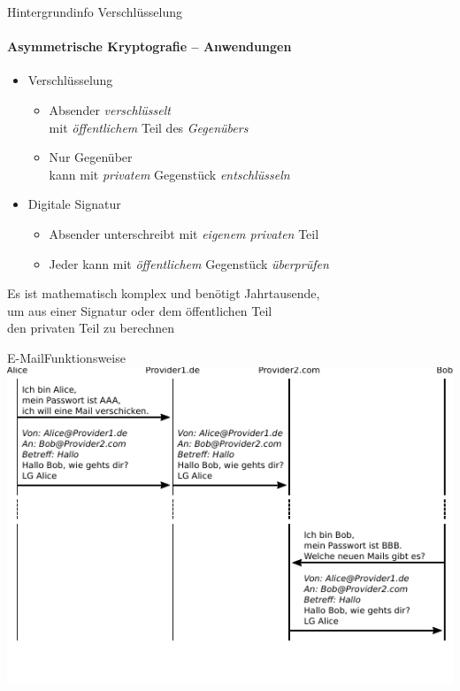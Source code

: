 \begin{frame}{Hintergrundinfo Verschlüsselung}
  \framesubtitle{Asymmetrische Kryptografie -- Anwendungen}
  \begin{itemize}
    \item Verschlüsselung
      \begin{itemize}
        \item Absender \emph{verschlüsselt}\\ mit \emph{öffentlichem} Teil des \emph{Gegenübers}
        \item Nur Gegenüber\\ kann mit \emph{privatem} Gegenstück \emph{entschlüsseln}
      \end{itemize}
    \item Digitale Signatur
      \begin{itemize}
        \item Absender unterschreibt mit \emph{eigenem privaten} Teil
        \item Jeder kann mit \emph{öffentlichem} Gegenstück \emph{überprüfen}
      \end{itemize}
  \end{itemize}
  Es ist mathematisch komplex und benötigt Jahrtausende,\\ um aus einer Signatur oder dem öffentlichen Teil\\ den privaten Teil zu berechnen
\end{frame}
\begin{frame}{E-Mail}{Funktionsweise}
  \includegraphics[width=.9\textwidth]{images/maildaten.pdf}
  \scriptsize
  ~\\
  ~\\
\end{frame}

